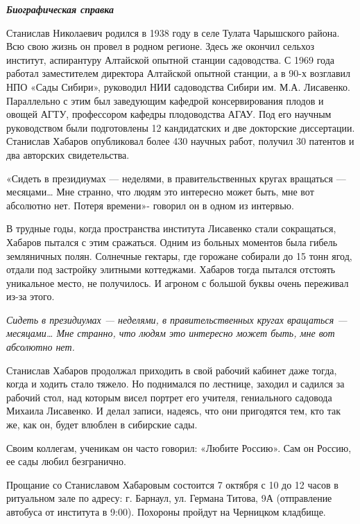 \begin{leftbar}
	\begingroup
				\em \textbf{Биографическая справка}\par
Станислав Николаевич родился в 1938 году в селе Тулата Чарышского района. Всю
свою жизнь он провел в родном регионе. Здесь же окончил сельхоз
институт, аспирантуру Алтайской опытной станции садоводства. С 1969
года работал заместителем директора Алтайской опытной станции, а в 90-х
возглавил НПО «Сады Сибири», руководил НИИ садоводства Сибири им. М.А.
Лисавенко. Параллельно с этим был заведующим кафедрой консервирования
плодов и овощей АГТУ, профессором кафедры плодоводства АГАУ. Под его
научным руководством были подготовлены 12 кандидатских и две докторские
диссертации. Станислав Хабаров опубликовал более 430 научных работ,
получил 30 патентов и два авторских свидетельства. 
	\endgroup
\end{leftbar}

«Сидеть в президиумах — неделями, в правительственных кругах вращаться —
месяцами… Мне странно, что людям это интересно может быть, мне вот абсолютно
нет. Потеря времени»- говорил он  в одном из интервью.

В трудные годы, когда пространства института Лисавенко стали сокращаться,
Хабаров пытался  с этим сражаться. Одним из больных моментов была гибель
земляничных полян. Солнечные гектары, где горожане собирали до 15 тонн ягод,
отдали под застройку элитными коттеджами. Хабаров тогда пытался отстоять
уникальное место, не получилось. И агроном с большой буквы очень переживал
из-за этого.

\begin{leftbar}
	\begingroup
		\em Сидеть в президиумах — неделями, в правительственных кругах вращаться —
				месяцами… Мне странно, что людям это интересно может быть, мне вот
				абсолютно нет. 
	\endgroup
\end{leftbar}

Станислав  Хабаров продолжал приходить в свой рабочий кабинет даже тогда, когда
и ходить стало тяжело. Но поднимался по лестнице, заходил и садился за рабочий
стол, над которым висел портрет его учителя, гениального садовода Михаила
Лисавенко. И делал записи, надеясь, что они пригодятся тем, кто так же, как он,
будет влюблен в сибирские сады.

Своим коллегам, ученикам он часто говорил: «Любите Россию». Сам он Россию, ее
сады любил безгранично.

Прощание  со Станиславом  Хабаровым состоится 7 октября с 10 до 12 часов в
ритуальном зале по адресу: г. Барнаул, ул. Германа Титова, 9А (отправление
автобуса от института в 9:00). Похороны пройдут на Черницком кладбище.
